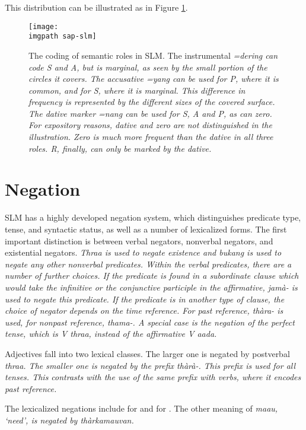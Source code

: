 This distribution can be illustrated as in Figure \ref{fig:argstr}.


\begin{figure}
 \centering
 \texttt{[image: \\imgpath sap-slm]}
 \caption[Coding of semantic roles in SLM]{The coding of semantic roles in SLM. The instrumental \em =dering \em can code S and A, but is marginal, as seen by the small portion of the circles it covers. The accusative \em =yang \em can be used for P, where it is common, and for S, where it is marginal. This difference in frequency is represented by the different sizes of the covered surface. The dative marker \em =nang \em can be used for S, A and P, as can zero. For expository reasons, dative and zero are not distinguished in the illustration. Zero is much more frequent than the dative in all three roles. R, finally, can only be marked by the dative.}
 \label{fig:argstr}
\end{figure}

\section{Negation}
SLM has a highly developed negation system, which distinguishes predicate type, tense, and syntactic status, as well as a number of lexicalized forms.  The first important distinction is between verbal negators, nonverbal negators, and existential negators. \em Thraa \em is used to negate existence and \em bukang \em is used to negate any other nonverbal predicates. Within the verbal predicates, there are a number of further choices. If the predicate is found in a subordinate clause which would take the infinitive or the conjunctive participle in the affirmative, \em jamà- \em is used to negate this predicate. If the predicate is in another type of clause, the choice of negator depends on the time reference. For past reference, \em thàra- \em is used, for nonpast reference, \em thama-\em. A special case is the negation of the perfect tense, which is \em V thraa\em, instead of the affirmative \em V aada\em.

Adjectives fall into two lexical classes. The larger one is negated by postverbal \em thraa\em. The smaller one is negated by the prefix \em thàrà-\em. This prefix is used for all tenses. This contrasts with the use of the same prefix with verbs, where it encodes past reference.

The lexicalized negations include  for  and  for . The other meaning of \em maau, \em `need', is negated by \em thàrkamauvan\em. 

